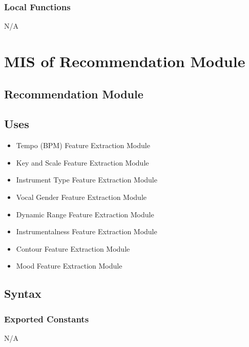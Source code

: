 \documentclass[12pt, titlepage]{article}
\begin{document}
\subsubsection{Local Functions}
N/A

\section{MIS of Recommendation Module} 

\subsection{Recommendation Module}


\subsection{Uses}
\begin{itemize}
  \item Tempo (BPM) Feature Extraction Module
  \item Key and Scale Feature Extraction Module
  \item Instrument Type Feature Extraction Module
  \item Vocal Gender Feature Extraction Module
  \item Dynamic Range Feature Extraction Module
  \item Instrumentalness Feature Extraction Module
  \item Contour Feature Extraction Module
  \item Mood Feature Extraction Module
\end{itemize}

\subsection{Syntax}

\subsubsection{Exported Constants}
N/A
\end{document}
